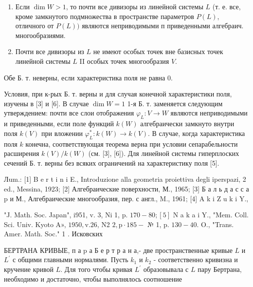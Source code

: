\documentclass[10pt]{article}
\begin{document}
\begin{enumerate}

  \item Если $\operatorname{dim} W>1$, то почти все дивизоры из линейной системы $L$ (т. е. все, кроме замкнутого подмножества в пространстве параметров $P(L)$, отличного от $P(L))$ являются неприводимыми п приведенными алгебраич. многообразиями.



  \item Почти все дивизоры из $L$ не имеют особых точек вне базисных точек линейной системы $L$ II особых точек многообразия $V$.



\end{enumerate}



Обе Б. т. неверны, если характеристика поля не равна 0.



Условия, при к-рых Б. т. верны и для случая конечной характеристики поля, изучены в [3] и [6]. В случае $\operatorname{dim} W=1$ 1-я Б. т. заменяется следующим утверждением: почти все слои отображения $\varphi_{L}: V \rightarrow W$ являются неприводимыми и приведенными, если поле функций $k(W)$ алгебраически замкнуто внутри поля $k(V)$ при вложении $\varphi_{L}^{*}: k(W) \rightarrow k(V)$. В случае, когда характеристика поля $k$ конечна, соответствующая теорема верна при условии сепарабельности расширения $k(V) / k(W)$ (см. [3], [6]). Для линейной системы гиперплоских сечений Б. т. верны без всяких ограничений на характеристику поля [5].



Лum.: [1] B e r t i n i E., Introduzione alla geometria proiettiva degli iperspazi, 2 ed., Messina, 1923; [2] Алгебраические поверхности, М., 1965; [3] Б а л ь д а с с а p и М., Алгебраические многообразия, пер. с англ., M., 1961; [4] A k i Z u k i Y.,

"J. Math. Soc. Japan", i951, v. 3, Ni 1, p. $170-80 ;[5]$ N a k a i Y., "Mem. Coll. Sci. Univ. Kyoto A», $1950, \mathrm{v} .26$, N2 $2, \mathrm{p} \cdot 185-$ № 1, p. $130-40$. O., "Trans. Amer. Math. Soc." 1 . Исковских



БЕРТРАНА КРИВЫЕ, п а $\mathrm{p}$ а Б е р т р а н а,- две пространственные кривые $L$ и $L^{\prime}$ с общими главными нормалями. Пусть $k_{1}$ и $k_{2}$ - соответственно кривизна и кручение кривой $L$. Для того чтобы кривая $L^{\prime}$ образовывала с $L$ пару Бертрана, необходимо и достаточно, чтобы выполнялось соотношение
\end{document}
